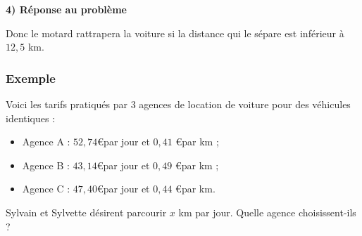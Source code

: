 \textbf{4) Réponse au problème}

Donc le motard rattrapera la voiture si la distance qui le sépare est inférieur à $12,5$ km. \\

\newpage

\subsubsection{Exemple }

Voici les tarifs pratiqués par 3 agences de location de voiture pour des véhicules identiques : \\

\begin{itemize}
\item Agence A : $52,74$\euro par jour et $0,41$ \euro par km ; 
\item Agence B : $43,14$\euro  par jour et $0,49$ \euro par km ; 
\item Agence C : $47,40$\euro par jour et $0,44$ \euro par km. \\
\end{itemize} 

Sylvain et Sylvette désirent parcourir $x$ km par jour. Quelle agence choisissent-ils ? \\

